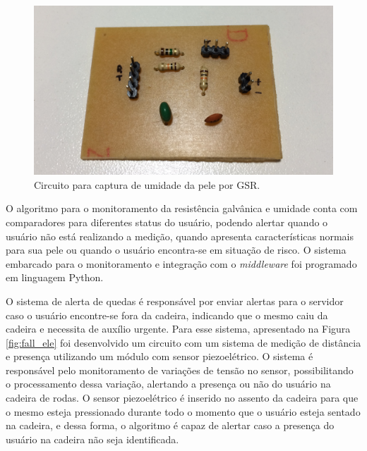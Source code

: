\begin{figure}[h!]
    \begin{center}
        \includegraphics[scale=0.075]{figuras/gsr_circ.jpg}
    \end{center}
    \caption{Circuito para captura de umidade da pele por GSR.}
    \label{fig:gsr_circ}
\end{figure}

O algoritmo para o monitoramento da resistência galvânica e umidade conta com
comparadores para diferentes status do usuário, podendo alertar quando o usuário
não está realizando a medição, quando apresenta características normais para sua
pele ou quando o usuário encontra-se em situação de risco. O sistema embarcado para
o monitoramento e integração com o \textit{middleware} foi programado em linguagem Python.

O sistema de alerta de quedas é responsável por enviar alertas para o servidor
caso o usuário encontre-se fora da cadeira, indicando que o mesmo caiu da cadeira
e necessita de auxílio urgente. Para esse sistema, apresentado na Figura \ref{fig:fall_ele} foi desenvolvido um circuito
com um sistema de medição de distância e presença utilizando um módulo com sensor
piezoelétrico. O sistema é responsável pelo monitoramento de variações de tensão
no sensor, possibilitando o processamento dessa variação, alertando a presença
ou não do usuário na cadeira de rodas. O sensor piezoelétrico é inserido no assento
da cadeira para que o mesmo esteja pressionado durante todo o momento que o usuário
esteja sentado na cadeira, e dessa forma, o algoritmo é capaz de alertar caso a
presença do usuário na cadeira não seja identificada.

